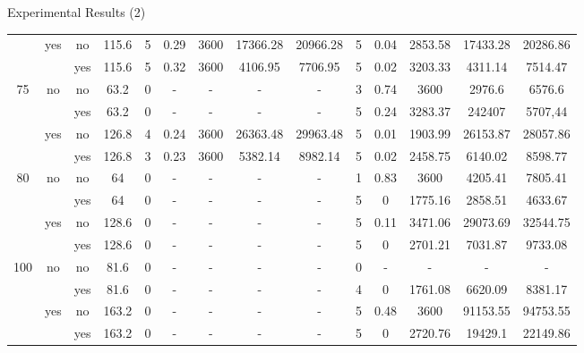 \documentclass[slidestop,usepdftitle=false,10pt]{beamer}
\begin{document}
\begin{frame}{Experimental Results (2)}
\begin{table}[htbp]
{\begin{tabular}{cccc|ccccc|ccccc|}
			\cline{2-14}      & \multirow{2}[2]{*}{yes} & no & 115.6 & 5 & 0.29 & 3600 & 17366.28 & 20966.28 & 5 & 0.04 & 2853.58 & 17433.28 & 20286.86 \bigstrut[t]\\
			&   & yes & 115.6 & 5 & 0.32 & 3600 & 4106.95 & 7706.95 & 5 & 0.02 & 3203.33 & 4311.14 & 7514.47 \bigstrut[b]\\
			\hline
			\multirow{4}[4]{*}{75} & \multirow{2}[2]{*}{no} & no & 63.2 & 0 & - & - & - & - & 3 & 0.74 & 3600 & 2976.6 & 6576.6 \bigstrut[t]\\
			&   & yes & 63.2 & 0 & - & - & - & - & 5 & 0.24 & 3283.37 & 242407 & 5707,44 \bigstrut[b]\\
			\cline{2-14}      & \multirow{2}[2]{*}{yes} & no & 126.8 & 4 & 0.24 & 3600 & 26363.48 & 29963.48 & 5 & 0.01 & 1903.99 & 26153.87 & 28057.86 \bigstrut[t]\\
			&   & yes & 126.8 & 3 & 0.23 & 3600 & 5382.14 & 8982.14 & 5 & 0.02 & 2458.75 & 6140.02 & 8598.77 \bigstrut[b]\\
			\hline
			\multirow{4}[4]{*}{80} & \multirow{2}[2]{*}{no} & no & 64 & 0 & - & - & - & - & 1 & 0.83 & 3600 & 4205.41 & 7805.41 \bigstrut[t]\\
			&   & yes & 64 & 0 & - & - & - & - & 5 & 0 & 1775.16 & 2858.51 & 4633.67 \bigstrut[b]\\
			\cline{2-14}      & \multirow{2}[2]{*}{yes} & no & 128.6 & 0 & - & - & - & - & 5 & 0.11 & 3471.06 & 29073.69 & 32544.75 \bigstrut[t]\\
			&   & yes & 128.6 & 0 & - & - & - & - & 5 & 0 & 2701.21 & 7031.87 & 9733.08 \bigstrut[b]\\
			\hline
			\multirow{4}[4]{*}{100} & \multirow{2}[2]{*}{no} & no & 81.6 & 0 & - & - & - & - & 0 & - & - & - & - \bigstrut[t]\\
			&   & yes & 81.6 & 0 & - & - & - & - & 4 & 0 & 1761.08 & 6620.09 & 8381.17 \bigstrut[b]\\
			\cline{2-14}      & \multirow{2}[2]{*}{yes} & no & 163.2 & 0 & - & - & - & - & 5 & 0.48 & 3600 & 91153.55 & 94753.55 \bigstrut[t]\\
			&   & yes & 163.2 & 0 & - & - & - & - & 5 & 0 & 2720.76 & 19429.1 & 22149.86 \bigstrut[b]\\
			\hline
			\end{tabular}}%
			\label{table:results}%
		\end{table}%


		
	\end{frame}
\end{document}
